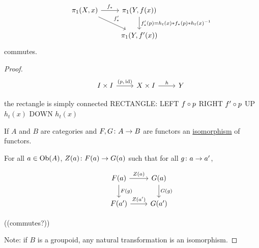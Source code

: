 \documentclass[11pt,leqno,oneside]{amsart}
\numberwithin{thm}{section}
\newcommand{\fund}[1][1]{\pi_{#1}}
\newcommand{\x}{\times}
\newcommand{\id}{\operatorname{id}}
\begin{document}
\begin{thm}
  $$\begin{tikzcd}
    &\fund(X,x) \arrow[r, "f_*"] \arrow[rd, "f'_*"] &\fund(Y,f(x)) \arrow[d, "f_*'(p) = h_t(x) * f_*(p) * h_t(x)^{-1}"] \\
    & &\fund(Y, f'(x))
  \end{tikzcd}$$ commutes.
\end{thm}
\begin{proof}
  $$\begin{tikzcd}
    &I \x I \arrow[r, "(p{,}\id)"] &X \x I \arrow[r, "h"] &Y
  \end{tikzcd}$$

  the rectangle is simply connected RECTANGLE: LEFT $f \circ p$ RIGHT
  $f' \circ p$ UP $h_t(x)$ DOWN $h_t(x)$

  If $A$ and $B$ are categories and $F,G\colon A \to B$ are functors an \underline{isomorphism} of functors.

  For all $a \in \operatorname{Ob}(A)$, $Z(a)\colon F(a) \to G(a)$ such that for all $g \colon a \to a'$,

  $$\begin{tikzcd}
    &F(a) \arrow[r, "Z(a)"] \arrow[d, "F(g)"] & G(a) \arrow[d, "G(g)"] \\
    &F(a') \arrow[r, "Z(a')"]                  & G(a')
  \end{tikzcd}$$

  ((commutes?))

  Note: if $B$ is a groupoid, any natural transformation is an isomorphism.
\end{proof}
\end{document}
